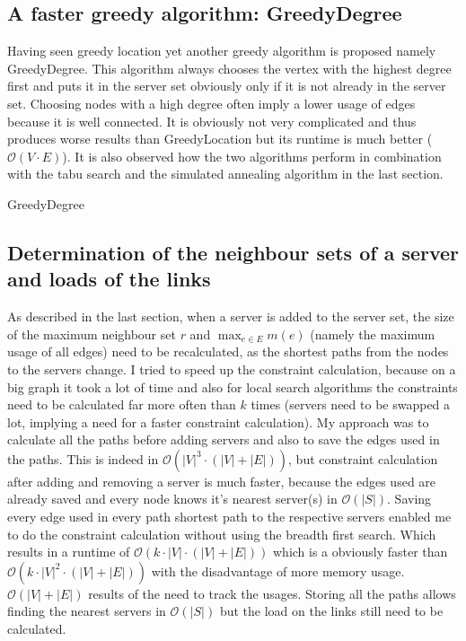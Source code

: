 \documentclass [12pt]{article}
\begin{document}
\subsection{A faster greedy algorithm: GreedyDegree}
Having seen greedy location yet another greedy algorithm is proposed namely GreedyDegree. This algorithm always chooses the vertex with the
highest degree first and puts it in the server set obviously only if it is not already in the server set. 
Choosing nodes with a high degree often imply a lower usage of edges because it is well connected. It is obviously not very complicated 
and thus produces worse results than GreedyLocation but its runtime is much better ($\mathcal O(V \cdot E)$). It is also observed how 
the two algorithms perform in combination with the tabu search and the simulated annealing algorithm in the last section. 
\begin{algorithm}[H]
  \caption{GreedyDegree}
  \label{greedydeg}
\end{algorithm}

\subsection{Determination of the neighbour sets of a server and loads of the links}
As described in the last section, when a server is added to the server set, the size of the maximum neighbour set $r$ and
$\max_{e \in E}m(e)$ (namely the maximum usage of all edges) need to be recalculated, as the shortest paths from the nodes 
to the servers change. I tried to speed up the constraint calculation, 
because on a big graph it took a lot of time and also for local search algorithms the constraints need to be calculated
far more often than $k$ times (servers need to be swapped a lot, implying a need for a faster constraint calculation).
My approach was to calculate all the paths before adding servers and also to save the edges used in the paths.
This is indeed in $\mathcal O(|V|^{3} \cdot (|V|+|E|))$, but constraint calculation after adding and removing a server is much faster,
because the edges used are already saved and every node knows it's nearest server(s) in $\mathcal O(|S|)$. Saving 
every edge used in every path shortest path to the respective servers enabled me to do the constraint calculation without using the breadth first search.
Which results in a runtime of $\mathcal O(k \cdot |V| \cdot (|V|+|E|))$ which is a obviously faster than $\mathcal O(k \cdot |V|^{2} \cdot (|V|+|E|))$ with the disadvantage of more memory usage.
$\mathcal O(|V|+|E|)$ results of the need to track the usages. Storing all the paths allows finding the nearest servers in $\mathcal O(|S|)$ but the load on the links 
still need to be calculated.
\end{document}
